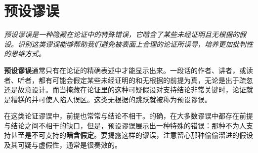 \section{预设谬误}

\begin{logicbox}[title=引言]
\textit{预设谬误是一种隐藏在论证中的特殊错误，它暗含了某些未经证明且无根据的假设。识别这类谬误能够帮助我们避免被表面上合理的论证所误导，培养更加批判性的思维方式。}
\end{logicbox}

\textbf{预设谬误}通常只有在论证的精确表述中才能显示出来。一段话的作者、讲者，或读者、听者，都有可能会假定某些未经证明的和无根据的前提为真，无论是出于疏忽还是故意设计。而当掩藏在论证里的这种可疑假设对支持结论非常关键时，论证就是糟糕的并可使人陷人误区。这类无根据的跳跃就被称为预设谬误。

在这类论证谬误中，前提也常常与结论不相干。的确，在大多数谬误中都存在前提与结论之间不相干的缺口，但是，预设谬误展示出一种特殊的错误：那种不为人支持甚至是不可支持的\textbf{暗含假定}。要揭露这样的谬误，注意留心那种偷偷溜进的假设及其可疑与虚假性，通常是很奏效的。 